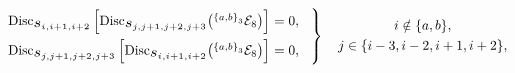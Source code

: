 \documentclass[11pt]{article}
\def\mand#1{\scaleto{s}{4.6pt}_{\scaleto{#1}{5.2pt}}}
\def\EthreeJ{{}^{{\{a,b\}}_3} {\cal E}_8}
\def\EfourJ{{}^{{\{a,b\}}_4} {\cal E}_8}
\begin{document}
\begin{equation}
\begin{rcases}
\text{Disc}_{\mand{i,i+1,i+2}}\left[\text{Disc}_{\mand{j,j+1,j+2,j+3}} \big(\EthreeJ \big) \right] \! \! \! \! &= 0, \hspace{.3cm} \\
\text{Disc}_{\mand{j,j+1,j+2,j+3}}\left[\text{Disc}_{\mand{i,i+1,i+2}} \big(\EthreeJ \big) \right] \! \! \! \! &= 0, \label{stein43}
\end{rcases} \quad 
\begin{gathered} i \notin \{a,b\}, \\ j \in \{i-3, i-2, i+1, i+2\}, \end{gathered}
\end{equation}
\end{document}
